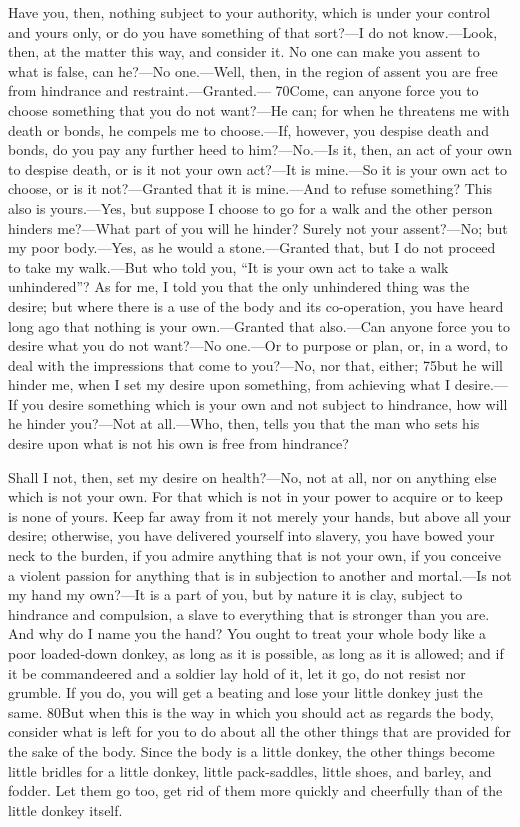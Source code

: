 Have you, then, nothing subject to your authority, which is under your control and yours only, or do you have something of that sort?—I do not know.—Look, then, at the matter this way, and consider it. No one can make you assent to what is false, can he?—No one.—Well, then, in the region of assent you are free from hindrance and restraint.—Granted.— 70Come, can anyone force you to choose something that you do not want?—He can; for when he threatens me with death or bonds, he compels me to choose.—If, however, you despise death and bonds, do you pay any further heed to him?—No.—Is it, then, an act of your own to despise death, or is it not your own act?—It is mine.—So it is your own act to choose, or is it not?—Granted that it is mine.—And to refuse something? This also is yours.—Yes, but suppose I choose to go for a walk and the other person hinders me?—What part of you will he hinder? Surely not your assent?—No; but my poor body.—Yes, as he would a stone.—Granted that, but I do not proceed to take my walk.—But who told you, ``It is your own act to take a walk unhindered''? As for me, I told you that the only unhindered thing was the desire; but where there is a use of the body and its co-operation, you have heard long ago that nothing is your own.—Granted that also.—Can anyone force you to desire what you do not want?—No one.—Or to purpose or plan, or, in a word, to deal with the impressions that come to you?—No, nor that, either; 75but he will hinder me, when I set my desire upon something, from achieving what I desire.—If you desire something which is your own and not subject to hindrance, how will he hinder you?—Not at all.—Who, then, tells you that the man who sets his desire upon what is not his own is free from hindrance?

Shall I not, then, set my desire on health?—No, not at all, nor on anything else which is not your own. For that which is not in your power to acquire or to keep is none of yours. Keep far away from it not merely your hands, but above all your desire; otherwise, you have delivered yourself into slavery, you have bowed your neck to the burden, if you admire anything that is not your own, if you conceive a violent passion for anything that is in subjection to another and mortal.—Is not my hand my own?—It is a part of you, but by nature it is clay, subject to hindrance and compulsion, a slave to everything that is stronger than you are. And why do I name you the hand? You ought to treat your whole body like a poor loaded-down donkey, as long as it is possible, as long as it is allowed; and if it be commandeered and a soldier lay hold of it, let it go, do not resist nor grumble. If you do, you will get a beating and lose your little donkey just the same. 80But when this is the way in which you should act as regards the body, consider what is left for you to do about all the other things that are provided for the sake of the body. Since the body is a little donkey, the other things become little bridles for a little donkey, little pack-saddles, little shoes, and barley, and fodder. Let them go too, get rid of them more quickly and cheerfully than of the little donkey itself.


